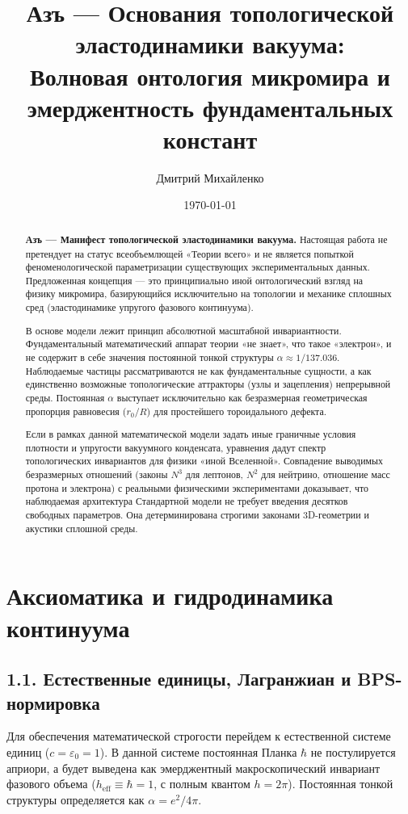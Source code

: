 \documentclass[11pt,a4paper]{article}
\title{\textbf{Азъ — Основания топологической эластодинамики вакуума:\\ Волновая онтология микромира и эмерджентность фундаментальных констант}}
\author{Дмитрий Михайленко}
\date{\today}
\begin{document}
	
	\maketitle
	
	\begin{abstract}
		\textbf{Азъ — Манифест топологической эластодинамики вакуума.} 
		Настоящая работа не претендует на статус всеобъемлющей «Теории всего» и не является попыткой феноменологической параметризации существующих экспериментальных данных. Предложенная концепция — это принципиально иной онтологический взгляд на физику микромира, базирующийся исключительно на топологии и механике сплошных сред (эластодинамике упругого фазового континуума).
		
		В основе модели лежит принцип абсолютной масштабной инвариантности. Фундаментальный математический аппарат теории «не знает», что такое «электрон», и не содержит в себе значения постоянной тонкой структуры $\alpha \approx 1/137.036$. Наблюдаемые частицы рассматриваются не как фундаментальные сущности, а как единственно возможные топологические аттракторы (узлы и зацепления) непрерывной среды. Постоянная $\alpha$ выступает исключительно как безразмерная геометрическая пропорция равновесия ($r_0/R$) для простейшего тороидального дефекта. 
		
		Если в рамках данной математической модели задать иные граничные условия плотности и упругости вакуумного конденсата, уравнения дадут спектр топологических инвариантов для физики «иной Вселенной». Совпадение выводимых безразмерных отношений (законы $N^3$ для лептонов, $N^2$ для нейтрино, отношение масс протона и электрона) с реальными физическими экспериментами доказывает, что наблюдаемая архитектура Стандартной модели не требует введения десятков свободных параметров. Она детерминирована строгими законами 3D-геометрии и акустики сплошной среды.
	\end{abstract}
	
	\section{Аксиоматика и гидродинамика континуума}
	
	\subsection{1.1. Естественные единицы, Лагранжиан и BPS-нормировка}
	Для обеспечения математической строгости перейдем к естественной системе единиц ($c = \varepsilon_0 = 1$). В данной системе постоянная Планка $\hbar$ не постулируется априори, а будет выведена как эмерджентный макроскопический инвариант фазового объема ($h_{\text{eff}} \equiv \hbar = 1$, с полным квантом $h = 2\pi$). Постоянная тонкой структуры определяется как $\alpha = e^2 / 4\pi$.
	
\end{document}
